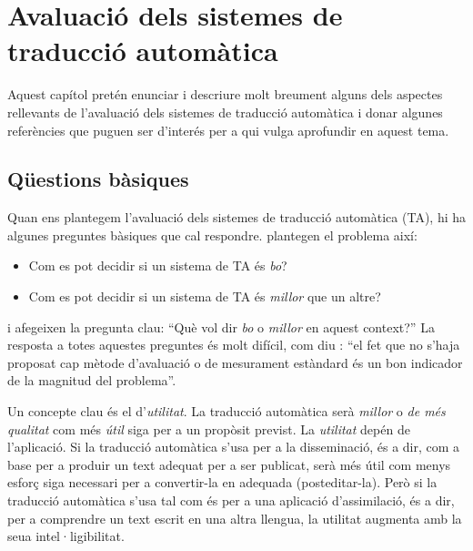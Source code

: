 \chapter[Avaluació dels sistemes de TA]{Avaluació dels sistemes de traducció automàtica}
\label{se:ASTA}

Aquest capítol pretén enunciar i descriure molt breument alguns dels
aspectes rellevants de l'avaluació dels sistemes de traducció
automàtica i donar algunes referències que puguen ser d'interés per a
qui vulga aprofundir en aquest tema.

\section{Qüestions bàsiques} 
Quan ens plantegem l'avaluació dels sistemes de traducció automàtica
(TA), hi ha algunes preguntes bàsiques que cal
respondre. \citet{arnold94b} plantegen el problema així:
\begin{itemize}
\item Com es pot decidir si un sistema de TA és \emph{bo}?
\item Com es pot decidir si un sistema de TA és \emph{millor} que un
  altre?
\end{itemize}
i afegeixen la pregunta clau: ``Què vol dir \emph{bo} o \emph{millor}
en aquest context?'' La resposta a totes aquestes preguntes és molt
difícil, com diu \citet{minnis94j}: ``el fet que no s'haja proposat
cap mètode d'avaluació o de mesurament estàndard és un bon indicador
de la magnitud del problema''.

Un concepte clau és el d'\emph{utilitat}. La traducció automàtica serà
\emph{millor} o \emph{de més qualitat} com més \emph{útil} siga per a
un propòsit previst. La \emph{utilitat} depén de l'aplicació. Si la
traducció automàtica s'usa per a la disseminació, és a dir, com a base
per a produir un text adequat per a ser publicat, serà més útil com
menys esforç siga necessari per a convertir-la en adequada
(posteditar-la). Però si la traducció automàtica s'usa tal com és per
a una aplicació d'assimilació, és a dir, per a comprendre un text
escrit en una altra llengua, la utilitat augmenta amb la seua
intel·ligibilitat.

